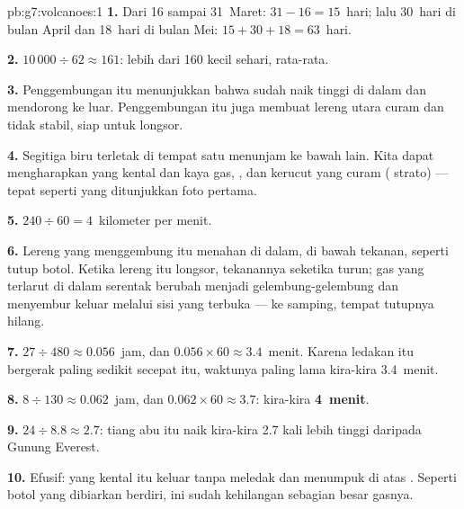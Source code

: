 \begin{solution}{pb:g7:volcanoes:1}
\textbf{1.} Dari 16 sampai 31~Maret: $31 - 16 = 15$~hari; lalu 30~hari di
bulan April dan 18~hari di bulan Mei: $15 + 30 + 18 = 63$~hari.

\textbf{2.} $10\,000 \div 62 \approx 161$: lebih dari 160  kecil
sehari, rata-rata.

\textbf{3.} Penggembungan itu menunjukkan bahwa  sudah naik tinggi di
dalam  dan mendorong  ke luar. Penggembungan itu juga membuat
lereng utara curam dan tidak stabil, siap untuk longsor.

\textbf{4.} Segitiga biru terletak di tempat satu  menunjam ke bawah
 lain. Kita dapat mengharapkan  yang kental dan kaya gas,
, dan kerucut yang curam ( strato) --- tepat
seperti yang ditunjukkan foto pertama.

\textbf{5.} $240 \div 60 = 4$~kilometer per menit.

\textbf{6.} Lereng yang menggembung itu menahan  di dalam, di bawah
tekanan, seperti tutup botol. Ketika lereng itu longsor, tekanannya
seketika turun; gas yang terlarut di dalam  serentak berubah menjadi
gelembung-gelembung dan menyembur keluar melalui sisi yang terbuka ---
ke samping, tempat tutupnya hilang.

\textbf{7.} $27 \div 480 \approx 0.056$~jam, dan $0.056 \times 60 \approx
3.4$~menit. Karena ledakan itu bergerak paling sedikit secepat itu,
waktunya paling lama kira-kira 3.4~menit.

\textbf{8.} $8 \div 130 \approx 0.062$~jam, dan $0.062 \times 60 \approx
3.7$: kira-kira \textbf{4~menit}.

\textbf{9.} $24 \div 8.8 \approx 2.7$: tiang abu itu naik kira-kira 2.7 kali
lebih tinggi daripada Gunung Everest.

\textbf{10.} Efusif:  yang kental itu keluar tanpa meledak dan menumpuk
di atas . Seperti botol yang dibiarkan berdiri,  ini
sudah kehilangan sebagian besar gasnya.


\end{solution}
